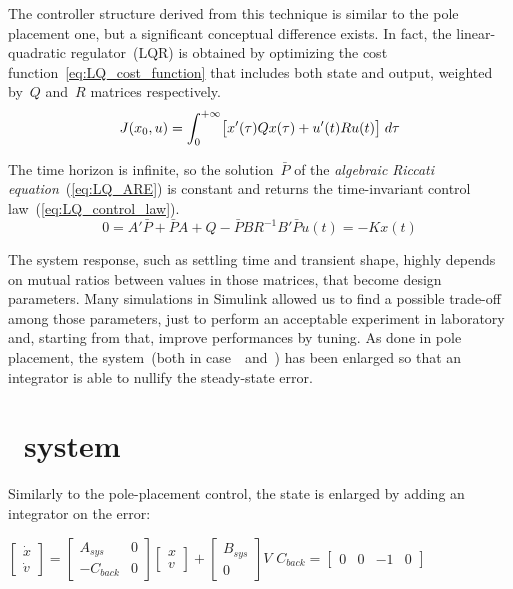 
The controller structure derived from this technique is similar to the pole placement one, but a significant conceptual difference exists. In fact, the linear-quadratic regulator~(LQR) is obtained by optimizing the cost function~\ref{eq:LQ_cost_function} that includes both state and output, weighted by~$Q$ and~$R$ matrices respectively.
\begin{equation}
	J(x_0, u) = \int_{0}^{+\infty} \bigl{[} x'(\tau)Qx(\tau) + u'(t)Ru(t) \bigr{]} \; d\tau
	\label{eq:LQ_cost_function}
\end{equation}

The time horizon is infinite, so the solution~$\bar{P}$ of the \textit{algebraic Riccati equation}~(\cref{eq:LQ_ARE}) is constant and returns the time-invariant control law~(\ref{eq:LQ_control_law}).
\begin{subequations}
	\begin{equation}
		0 = A' \bar{P} + \bar{P} A + Q - \bar{P} B R^{-1} B' \bar{P}
		\label{eq:LQ_ARE}
	\end{equation}
	\begin{equation}
		u(t) = -K x(t)
		\label{eq:LQ_control_law}
	\end{equation}
\end{subequations}

The system response, such as settling time and transient shape, highly depends on mutual ratios between values in those matrices, that become design parameters. Many simulations in Simulink allowed us to find a possible trade-off among those parameters, just to perform an acceptable experiment in laboratory and, starting from that, improve performances by tuning.
As done in pole placement, the system~(both in case~\onedof\ and~\twodof) has been enlarged so that an integrator is able to nullify the steady-state error.

\section{\onedof\ system}

Similarly to the pole-placement control, the state is enlarged by adding an integrator on the error:
\begin{center}
	$\begin{bmatrix}
		\dot{x} \\
		\dot{v}
	\end{bmatrix}
	=
	\begin{bmatrix}
		A_{sys} & 0 \\
		-C_{back} & 0
	\end{bmatrix}
	\begin{bmatrix}
		x \\
		v
	\end{bmatrix}
	+
	\begin{bmatrix}
		B_{sys} \\
		0
	\end{bmatrix}
	V$		\qquad $ C_{back} =
	\begin{bmatrix}
		0 & 0 & -1 & 0
	\end{bmatrix}$
\end{center}


